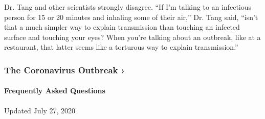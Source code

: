 Dr. Tang and other scientists strongly disagree. ``If I'm talking to an
infectious person for 15 or 20 minutes and inhaling some of their air,''
Dr. Tang said, ``isn't that a much simpler way to explain transmission
than touching an infected surface and touching your eyes? When you're
talking about an outbreak, like at a restaurant, that latter seems like
a torturous way to explain transmission.''

\href{https://www.nytimes.com/news-event/coronavirus?action=click\&pgtype=Article\&state=default\&region=MAIN_CONTENT_3\&context=storylines_faq}{}

\hypertarget{the-coronavirus-outbreak-}{%
\subsubsection{The Coronavirus Outbreak
›}\label{the-coronavirus-outbreak-}}

\hypertarget{frequently-asked-questions}{%
\paragraph{Frequently Asked
Questions}\label{frequently-asked-questions}}

Updated July 27, 2020

